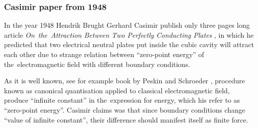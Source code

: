 \documentclass[10pt,t]{beamer}
\begin{document}
\begin{frame}
  \frametitle{Casimir paper from 1948}


  In the year 1948 Hendrik Brught Gerhard Casimir publish only three pages
  long article \textit{On~the~Attraction Between Two Perfectly Conducting
    Plates} \parencite{Casimir-On-the-Attraction-Between-ETC-Pub-1948}, in which
  he predicted that two electrical neutral plates put inside the cubic cavity
  will attract each other due to strange relation between ``zero-point
  energy'' of the~electromagnetic field with different boundary conditions.

  As it is well known, see for example book by Peskin and Schroeder
  \parencite{Peskin-Schroeder-An-Introduction-to-Quantum-Field-Theory-Pub-1995},
  procedure known as canonical quantisation applied to classical
  electromagnetic field, produce ``infinite constant'' in the~expression
  for energy, which his refer to as ``zero-point energy''. Casimir claims
  was that since boundary conditions change ``value of infinite constant'',
  their difference should manifest itself as finite force.


\end{frame}
\end{document}
